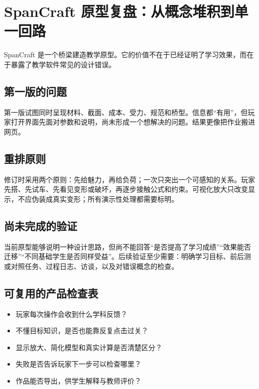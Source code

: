 \chapter{SpanCraft 原型复盘：从概念堆积到单一回路}

SpanCraft 是一个桥梁建造教学原型。它的价值不在于已经证明了学习效果，而在于暴露了教学软件常见的设计错误。

\section*{第一版的问题}

第一版试图同时呈现材料、截面、成本、受力、规范和桥型。信息都“有用”，但玩家打开界面先面对参数和说明，尚未形成一个想解决的问题。结果更像把作业搬进网页。

\section*{重排原则}

修订时采用两个原则：先给魅力，再给负荷；一次只突出一个可感知的关系。玩家先搭、先试车、先看见变形或破坏，再逐步接触公式和约束。可视化放大只改变显示，不应伪装成真实变形；所有演示性处理都需要标明。

\section*{尚未完成的验证}

当前原型能够说明一种设计思路，但尚不能回答“是否提高了学习成绩”“效果能否迁移”“不同基础学生是否同样受益”。后续验证至少需要：明确学习目标、前后测或对照任务、过程日志、访谈，以及对错误概念的检查。

\section*{可复用的产品检查表}

\begin{itemize}
  \item 玩家每次操作会收到什么学科反馈？
  \item 不懂目标知识，是否也能靠反复点击过关？
  \item 显示放大、简化模型和真实计算是否清楚区分？
  \item 失败是否告诉玩家下一步可以检查哪里？
  \item 作品能否导出，供学生解释与教师评价？
\end{itemize}
